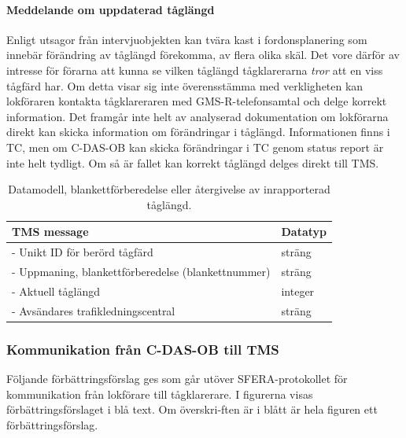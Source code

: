 \paragraph{Meddelande om uppdaterad tåglängd}
Enligt utsagor från intervjuobjekten kan tvära kast i fordonsplanering som innebär förändring av tåglängd förekomma, av flera olika skäl.
Det vore därför av intresse för förarna att kunna se vilken tåglängd tågklarerarna \emph{tror} att en viss tågfärd har.
Om detta visar sig inte överensstämma med verkligheten kan lokföraren kontakta tågklareraren med GMS-R-telefonsamtal och delge korrekt information.
Det framgår inte helt av analyserad dokumentation om lokförarna direkt kan skicka information om förändringar i tåglängd.
Informationen finns i TC, men om C-DAS-OB kan skicka förändringar i TC genom status report är inte helt tydligt.
Om så är fallet kan korrekt tåglängd delges direkt till TMS\@.
\begin{table}[hbt!]
    \centering
    \begin{tabular}{|l|l|}
        \hline
        \color{blue}
        \textbf{TMS message} & Datatyp \\
        \hline
        - Unikt ID för berörd tågfärd & sträng \\
        - Uppmaning, blankettförberedelse (blankettnummer) & sträng \\
        - Aktuell tåglängd & integer \\
        - Avsändares trafikledningscentral & sträng\\
        \hline
    \end{tabular}
    \caption{Datamodell, blankettförberedelse eller återgivelse av inrapporterad tåglängd.}
    \label{tab:tmsMessage}
\end{table}
\subsubsection{Kommunikation från C-DAS-OB till TMS}
Följande förbättringsförslag ges som går utöver SFERA-protokollet för kommunikation från lokförare till tågklarerare.
I figurerna visas förbättringsförslaget i blå text.
Om överskri-ften är i blått är hela figuren ett förbättringsförslag.
